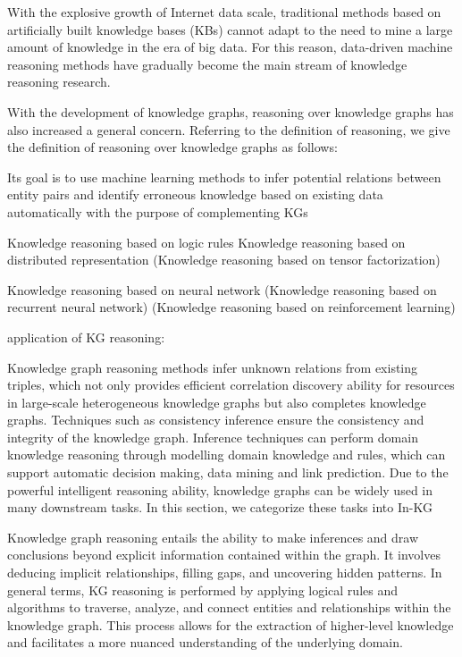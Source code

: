 With the explosive growth of Internet data scale, traditional
methods based on artificially built knowledge bases (KBs) cannot
adapt to the need to mine a large amount of knowledge in the era
of big data. For this reason, data-driven machine reasoning methods have gradually become the main stream of knowledge reasoning research.

With the development of knowledge graphs, reasoning over
knowledge graphs has also increased a general concern. Referring
to the definition of reasoning, we give the definition of reasoning
over knowledge graphs as follows:


Its goal is to use machine learning methods to infer potential
relations between entity pairs and identify erroneous knowledge
based on existing data automatically with the purpose of complementing KGs

Knowledge reasoning based on logic rules
Knowledge reasoning based on distributed representation (Knowledge reasoning based on tensor factorization)

Knowledge reasoning based on neural network
(Knowledge reasoning based on recurrent neural network)
(Knowledge reasoning based on reinforcement learning)

application of KG reasoning:

Knowledge graph reasoning methods infer unknown relations
from existing triples, which not only provides efficient correlation discovery ability for resources in large-scale heterogeneous
knowledge graphs but also completes knowledge graphs. Techniques such as consistency inference ensure the consistency and
integrity of the knowledge graph. Inference techniques can perform
domain knowledge reasoning through modelling domain knowledge and rules, which can support automatic decision making, data
mining and link prediction. Due to the powerful intelligent reasoning ability, knowledge graphs can be widely used in many downstream tasks. In this section, we categorize these tasks into In-KG


Knowledge graph reasoning entails the ability to make inferences and draw conclusions beyond explicit information contained within the graph. It involves deducing implicit relationships, filling gaps, and uncovering hidden patterns. In general terms, KG reasoning is performed by applying logical rules and algorithms to traverse, analyze, and connect entities and relationships within the knowledge graph. This process allows for the extraction of higher-level knowledge and facilitates a more nuanced understanding of the underlying domain.

